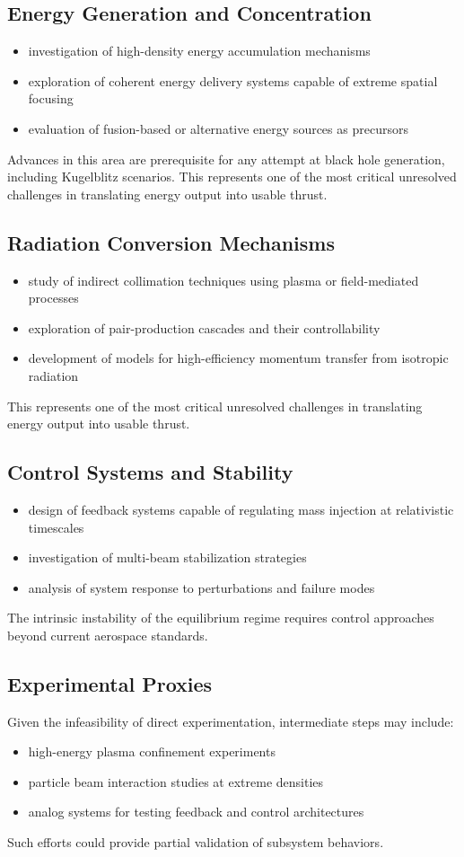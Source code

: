 \documentclass[conference]{IEEEtran}
\begin{document}
\subsection{Energy Generation and Concentration}
\begin{itemize}
\item investigation of high-density energy accumulation mechanisms
\item exploration of coherent energy delivery systems capable of extreme spatial focusing
\item evaluation of fusion-based or alternative energy sources as precursors
\end{itemize}
Advances in this area are prerequisite for any attempt at black hole generation, including Kugelblitz scenarios. This represents one of the most critical unresolved challenges in translating energy output into usable thrust.
\subsection{Radiation Conversion Mechanisms}
\begin{itemize}
\item study of indirect collimation techniques using plasma or field-mediated processes
\item exploration of pair-production cascades and their controllability
\item development of models for high-efficiency momentum transfer from isotropic radiation
\end{itemize}
This represents one of the most critical unresolved challenges in translating energy output into usable thrust.
\subsection{Control Systems and Stability}
\begin{itemize}
\item design of feedback systems capable of regulating mass injection at relativistic timescales
\item investigation of multi-beam stabilization strategies
\item analysis of system response to perturbations and failure modes
\end{itemize}
The intrinsic instability of the equilibrium regime requires control approaches beyond current aerospace standards.
\subsection{Experimental Proxies}
Given the infeasibility of direct experimentation, intermediate steps may include:
\begin{itemize}
\item high-energy plasma confinement experiments
\item particle beam interaction studies at extreme densities
\item analog systems for testing feedback and control architectures
\end{itemize}
Such efforts could provide partial validation of subsystem behaviors.
\end{document}
